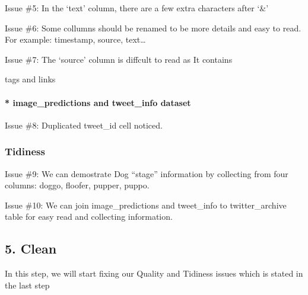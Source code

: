 \documentclass[11pt]{article}
\begin{document}
    Issue \#5: In the `text' column, there are a few extra characters after
`\&'

    Issue \#6: Some collumns should be renamed to be more details and easy
to read. For example: timestamp, source, text\ldots{}

    Issue \#7: The `source' column is diffcult to read as It contains

tags and links

    \hypertarget{image_predictions-and-tweet_info-dataset}{%
\paragraph{* image\_predictions and tweet\_info
dataset}\label{image_predictions-and-tweet_info-dataset}}

    Issue \#8: Duplicated tweet\_id cell noticed.

    \hypertarget{tidiness}{%
\subsubsection{Tidiness}\label{tidiness}}

    Issue \#9: We can demostrate Dog ``stage'' information by collecting
from four columns: doggo, floofer, pupper, puppo.

    Issue \#10: We can join image\_predictions and tweet\_info to
twitter\_archive table for easy read and collecting information.

    \hypertarget{clean}{%
\subsection{5. Clean}\label{clean}}

    In this step, we will start fixing our Quality and Tidiness issues which
is stated in the last step
\end{document}
